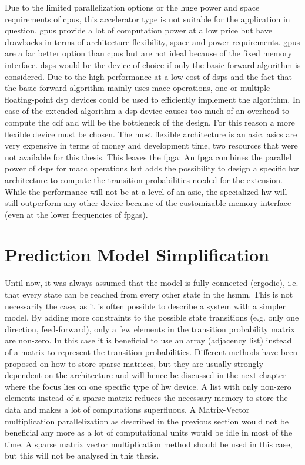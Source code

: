 \documentclass[mscthesis]{usiinfthesis}
\begin{document}
Due to the limited parallelization options or the huge power and space
requirements of \glspl{cpu}, this accelerator type is not suitable for the
application in question. \glspl{gpu} provide a lot of computation power at
a low price but have drawbacks in terms of architecture flexibility, space and
power requirements. \glspl{gpu} are a far better option than \glspl{cpu} but
are not ideal because of the fixed memory interface. \glspl{dsp} would be the
device of choice if only the basic forward algorithm is considered. Due to the
high performance at a low cost of \glspl{dsp} and the fact that the basic
forward algorithm mainly uses \gls{macc} operations, one or multiple
floating-point \gls{dsp} devices could be used to efficiently implement the
algorithm.  In case of the extended algorithm a \gls{dsp} device causes too
much of an overhead to compute the \gls{cdf} and will be the bottleneck of the
design. For this reason a more flexible device must be chosen. The most
flexible architecture is an \gls{asic}. \glspl{asic} are very expensive in
terms of money and development time, two resources that were not available for
this thesis. This leaves the \gls{fpga}: An \gls{fpga} combines the parallel
power of \glspl{dsp} for \gls{macc} operations but adds the possibility to
design a specific \gls{hw} architecture to compute the transition probabilities
needed for the extension. While the performance will not be at a level of an
\gls{asic}, the specialized \gls{hw} will still outperform any other device
because of the customizable memory interface (even at the lower frequencies of
\glspl{fpga}).

\section{Prediction Model Simplification}
\label{ch:analysis_simple}

Until now, it was always assumed that the model is fully connected (ergodic),
i.e. that every state can be reached from every other state in the \gls{hsmm}.
This is not necessarily the case, as it is often possible to describe a system
with a simpler model. By adding more constraints to the possible state
transitions (e.g. only one direction, feed-forward), only a few elements in the
transition probability matrix are non-zero. In this case it is beneficial to
use an array (adjacency list) instead of a matrix to represent the transition
probabilities. Different methods have been proposed on how to store sparse
matrices, but they are usually strongly dependent on the architecture and will
hence be discussed in the next chapter where the focus lies on one specific
type of \gls{hw} device. A list with only non-zero elements instead of a sparse
matrix reduces the necessary memory to store the data and makes a lot of
computations superfluous. A Matrix-Vector multiplication parallelization as
described in the previous section would not be beneficial any more as a lot of
computational units would be idle in most of the time. A sparse matrix vector
multiplication method should be used in this case, but this will not be
analysed in this thesis.
\end{document}
